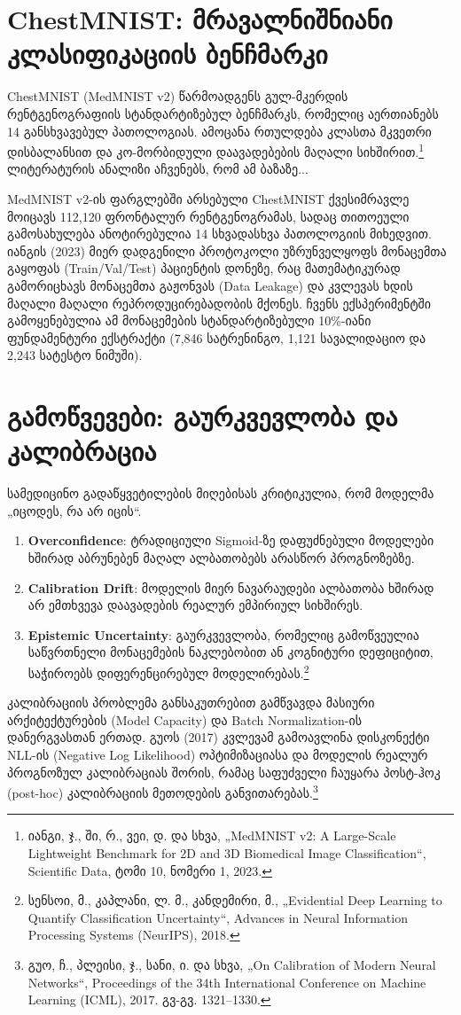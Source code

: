 \documentclass[12pt,a4paper,oneside]{report}
\begin{document}
\section{ChestMNIST: მრავალნიშნიანი კლასიფიკაციის ბენჩმარკი}
ChestMNIST (MedMNIST v2) წარმოადგენს გულ-მკერდის რენტგენოგრაფიის სტანდარტიზებულ ბენჩმარკს, რომელიც აერთიანებს 14 განსხვავებულ პათოლოგიას. ამოცანა რთულდება კლასთა მკვეთრი დისბალანსით და კო-მორბიდული დაავადებების მაღალი სიხშირით.\footnote{იანგი, ჯ., ში, რ., ვეი, დ. და სხვა, „MedMNIST v2: A Large-Scale Lightweight Benchmark for 2D and 3D Biomedical Image Classification“, Scientific Data, ტომი 10, ნომერი 1, 2023.} ლიტერატურის ანალიზი აჩვენებს, რომ ამ ბაზაზე... 

MedMNIST v2-ის ფარგლებში არსებული ChestMNIST ქვესიმრავლე მოიცავს 112,120 ფრონტალურ რენტგენოგრამას, სადაც თითოეული გამოსახულება ანოტირებულია 14 სხვადასხვა პათოლოგიის მიხედვით. იანგის (2023) მიერ დადგენილი პროტოკოლი უზრუნველყოფს მონაცემთა გაყოფას (Train/Val/Test) პაციენტის დონეზე, რაც მათემატიკურად გამორიცხავს მონაცემთა გაჟონვას (Data Leakage) და კვლევას ხდის მაღალი მაღალი რეპროდუცირებადობის მქონეს. ჩვენს ექსპერიმენტში გამოყენებულია ამ მონაცემების სტანდარტიზებული 10\%-იანი ფუნდამენტური ექსტრაქტი (7,846 სატრენინგო, 1,121 სავალიდაციო და 2,243 სატესტო ნიმუში).

\section{გამოწვევები: გაურკვევლობა და კალიბრაცია}
სამედიცინო გადაწყვეტილების მიღებისას კრიტიკულია, რომ მოდელმა „იცოდეს, რა არ იცის“.
\begin{enumerate}[leftmargin=1.6em]
    \item \textbf{Overconfidence}: ტრადიციული Sigmoid-ზე დაფუძნებული მოდელები ხშირად აბრუნებენ მაღალ ალბათობებს არასწორ პროგნოზებზე.
    \item \textbf{Calibration Drift}: მოდელის მიერ ნავარაუდები ალბათობა ხშირად არ ემთხვევა დაავადების რეალურ ემპირიულ სიხშირეს.
    \item \textbf{Epistemic Uncertainty}: გაურკვევლობა, რომელიც გამოწვეულია საწვრთნელი მონაცემების ნაკლებობით ან კოგნიტური დეფიციტით, საჭიროებს დიფერენცირებულ მოდელირებას.\footnote{სენსოი, მ., კაპლანი, ლ. მ., კანდემირი, მ., „Evidential Deep Learning to Quantify Classification Uncertainty“, Advances in Neural Information Processing Systems (NeurIPS), 2018.}
\end{enumerate}

კალიბრაციის პრობლემა განსაკუთრებით გამწვავდა მასიური არქიტექტურების (Model Capacity) და Batch Normalization-ის დანერგვასთან ერთად. გუოს (2017) კვლევამ გამოავლინა დისკონექტი NLL-ის (Negative Log Likelihood) ოპტიმიზაციასა და მოდელის რეალურ პროგნოზულ კალიბრაციას შორის, რამაც საფუძველი ჩაუყარა პოსტ-ჰოკ (post-hoc) კალიბრაციის მეთოდების განვითარებას.\footnote{გუო, ჩ., პლეისი, ჯ., სანი, ი. და სხვა, „On Calibration of Modern Neural Networks“, Proceedings of the 34th International Conference on Machine Learning (ICML), 2017. გვ-გვ. 1321–1330.}
\end{document}
